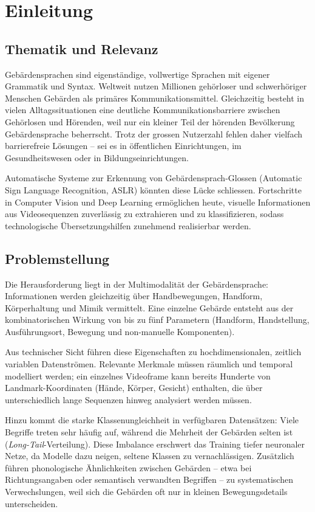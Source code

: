 \chapter{Einleitung}

\section{Thematik und Relevanz}
Gebärdensprachen sind eigenständige, vollwertige Sprachen mit eigener Grammatik und Syntax. Weltweit nutzen Millionen gehörloser und schwerhöriger Menschen Gebärden als primäres Kommunikationsmittel. Gleichzeitig besteht in vielen Alltagssituationen eine deutliche Kommunikationsbarriere zwischen Gehörlosen und Hörenden, weil nur ein kleiner Teil der hörenden Bevölkerung Gebärdensprache beherrscht. Trotz der grossen Nutzerzahl fehlen daher vielfach barrierefreie Lösungen – sei es in öffentlichen Einrichtungen, im Gesundheitswesen oder in Bildungseinrichtungen.

Automatische Systeme zur Erkennung von Gebärdensprach-Glossen (Automatic Sign Language Recognition, ASLR) könnten diese Lücke schliessen. Fortschritte in Computer Vision und Deep Learning ermöglichen heute, visuelle Informationen aus Videosequenzen zuverlässig zu extrahieren und zu klassifizieren, sodass technologische Übersetzungshilfen zunehmend realisierbar werden.

\section{Problemstellung}
Die Herausforderung liegt in der Multimodalität der Gebärdensprache: Informationen werden gleichzeitig über Handbewegungen, Handform, Körperhaltung und Mimik vermittelt. Eine einzelne Gebärde entsteht aus der kombinatorischen Wirkung von bis zu fünf Parametern (Handform, Handstellung, Ausführungsort, Bewegung und non-manuelle Komponenten).

Aus technischer Sicht führen diese Eigenschaften zu hochdimensionalen, zeitlich variablen Datenströmen. Relevante Merkmale müssen räumlich und temporal modelliert werden; ein einzelnes Videoframe kann bereits Hunderte von Landmark-Koordinaten (Hände, Körper, Gesicht) enthalten, die über unterschiedlich lange Sequenzen hinweg analysiert werden müssen.

Hinzu kommt die starke Klassenungleichheit in verfügbaren Datensätzen: Viele Begriffe treten sehr häufig auf, während die Mehrheit der Gebärden selten ist (\textit{Long-Tail}-Verteilung). Diese Imbalance erschwert das Training tiefer neuronaler Netze, da Modelle dazu neigen, seltene Klassen zu vernachlässigen. Zusätzlich führen phonologische Ähnlichkeiten zwischen Gebärden – etwa bei Richtungsangaben oder semantisch verwandten Begriffen – zu systematischen Verwechslungen, weil sich die Gebärden oft nur in kleinen Bewegungsdetails unterscheiden.


